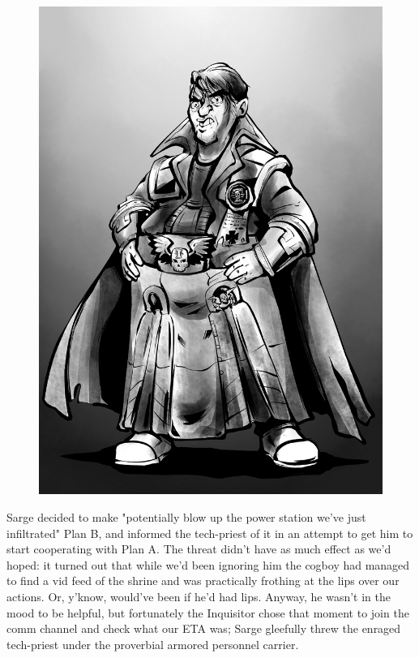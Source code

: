\begin{figure}
	\begin{center}
		\includegraphics[width=\figwidth]{pics/18/10 large.png}
	\end{center}
\end{figure}
Sarge decided to make "potentially blow up the power station we've just infiltrated" Plan B, and informed the tech-priest of it in an attempt to get him to start cooperating with Plan A. 
The threat didn't have as much effect as we'd hoped: 
it turned out that while we'd been ignoring him the cogboy had managed to find a vid feed of the shrine and was practically frothing at the lips over our actions. 
Or, y'know, would've been if he'd had lips. 
Anyway, he wasn't in the mood to be helpful, but fortunately the Inquisitor chose that moment to join the comm channel and check what our ETA was; 
Sarge gleefully threw the enraged tech-priest under the proverbial armored personnel carrier.

